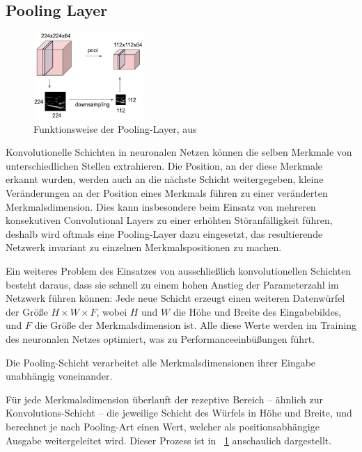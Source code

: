 \subsection{Pooling Layer}
\label{ssec:pooling}

\begin{figure}
	\centering
	\includegraphics[width=0.37\textwidth,keepaspectratio]{images/cs231n/pool.jpg}
	\captionsetup{format=plain}
	\caption{Funktionsweise der Pooling-Layer, aus \cite{cs231n}}
	\label{fig:pooling}
\end{figure}

Konvolutionelle Schichten in neuronalen Netzen können die selben Merkmale von unterschiedlichen Stellen extrahieren. Die Position, an der diese Merkmale erkannt wurden, werden auch an die nächste Schicht weitergegeben, \dahe kleine Veränderungen an der Position eines Merkmals führen zu einer veränderten Merkmalsdimension. \cite{brownlee_19} Dies kann insbesondere beim Einsatz von mehreren konsekutiven Convolutional Layers zu einer erhöhten Störanfälligkeit führen, deshalb wird oftmals eine Pooling-Layer dazu eingesetzt, das resultierende Netzwerk invariant zu einzelnen Merkmalspositionen zu machen. \cite{deeplearning_16}

Ein weiteres Problem des Einsatzes von ausschließlich konvolutionellen Schichten besteht daraus, dass sie schnell zu einem hohen Anstieg der Parameterzahl im Netzwerk führen können: Jede neue Schicht erzeugt einen weiteren Datenwürfel der Größe $H\times W\times F$, wobei $H$ und $W$ die Höhe und Breite des Eingabebildes, und $F$ die Größe der Merkmalsdimension ist. Alle diese Werte werden im Training des neuronalen Netzes optimiert, was zu Performanceeinbüßungen führt. \cite{cs231n}

Die Pooling-Schicht verarbeitet alle Merkmalsdimensionen ihrer Eingabe unabhängig voneinander.

Für jede Merkmalsdimension überlauft der rezeptive Bereich -- ähnlich zur Konvolutions-Schicht -- die jeweilige Schicht des Würfels in Höhe und Breite, und berechnet je nach Pooling-Art einen Wert, welcher als positionsabhängige Ausgabe weitergeleitet wird. Dieser Prozess ist in \figurename~\ref{fig:pooling} anschaulich dargestellt.

